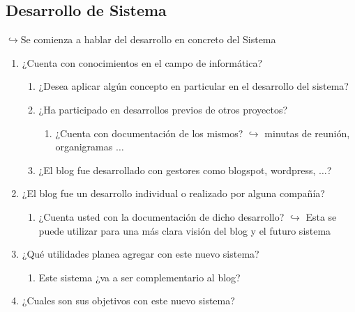 \documentclass[a4paper,10pt]{article}
\begin{document}
\subsection{Desarrollo de Sistema}
$\hookrightarrow{}$Se comienza a hablar del desarrollo en concreto del Sistema
\begin{enumerate}
    \item ¿Cuenta con conocimientos en el campo de informática?
    \begin{enumerate}
        \item ¿Desea aplicar algún concepto en particular en el desarrollo del sistema?
        \item ¿Ha participado en desarrollos previos de otros proyectos?
        \begin{enumerate}
            \item ¿Cuenta con documentación de los mismos? 
            \subitem $\hookrightarrow{}$ minutas de reunión, organigramas $\ldots$
        \end{enumerate}
        \item ¿El blog fue desarrollado con gestores como blogspot, wordpress, $\ldots$? 
    \end{enumerate}
    \item ¿El blog fue un desarrollo individual o realizado por alguna compañía? 
    \begin{enumerate}
        \item ¿Cuenta usted con la documentación de dicho desarrollo?
        \subitem $\hookrightarrow{}$ Esta se puede utilizar para una más clara visión del blog y el futuro sistema
    \end{enumerate}
    \item ¿Qué utilidades planea agregar con este nuevo sistema?
    \begin{enumerate}
        \item Este sistema ¿va a ser complementario al blog?
    \end{enumerate}
    \item ¿Cuales son sus objetivos con este nuevo sistema?
\end{enumerate}
\end{document}
